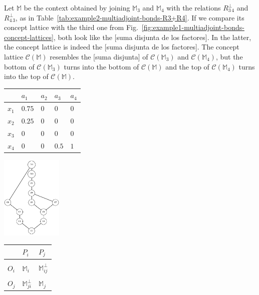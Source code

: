 \documentclass[runningheads,a4paper]{llncs}
\newcommand{\M}{\mathbb{M}}
\newcommand{\calC}{\mathcal C}
\newcommand{\editornote}[1]{{\color{red}[#1]}}
\begin{document}
\begin{example}
Let $\M$ be the context obtained by joining $\M_3$ and $\M_4$ with the relations $R_{3\,4}^\bot$ and $R_{4\,3}^\bot$, as in Table~\ref{tab:example2-multiadjoint-bonds-R3+R4}. If we compare its concept lattice with the third one from Fig.~\ref{fig:example1-multiadjoint-bonds-concept-lattices}, both look like the \editornote{suma disjunta de los factores}. In the latter, the concept lattice is indeed the \editornote{suma disjunta de los factores}. The concept lattice $\calC(\M)$ resembles the \editornote{suma disjunta} of $\calC(\M_3)$ and $\calC(\M_4)$, but the bottom of $\calC(\M_3)$ turns into the bottom of $\calC(\M)$ and the top of $\calC(\M_4)$ turns into the top of $\calC(\M)$.
\begin{table}
	\centering
	\vspace{-0.5cm}
	\begin{minipage}{0.3\textwidth}
	\begin{tabular}{w{c}{20pt} || w{c}{20pt} | w{c}{20pt} || w{c}{20pt} | w{c}{20pt}}
		& $a_1$ & $a_2$ & $a_3$ & $a_4$ \\\hline\hline
		$x_1$ & $0.75$ & $0$ & $0$ & $0$ \\\hline
		$x_2$ & $0.25$ & $0$ & $0$ & $0$ \\\hline\hline
		$x_3$ & $0$ & $0$ &$0$ & $0$ \\\hline
		$x_4$ & $0$ & $0$ &$0.5$ & $1$
	\end{tabular}
	\end{minipage}
	\hspace{1cm}
	\begin{minipage}{0.3\textwidth}
	\includegraphics[height = 4cm]{im/ex-ma2-R3+R4.png}
	\end{minipage}
	\begin{minipage}{0.25\textwidth}
	\begin{tabular}{w{c}{25pt} || w{c}{25pt} | w{c}{25pt}}
		& $P_i$ & $P_j$ \\[3pt]\hline\hline&&\\[-7pt]
		$O_i$ & $\M_i$ & $\M_{ij}^\bot$ \\[3pt]\hline&&\\[-7pt]
		$O_j$ & $\M_{ji}^\bot$ & $\M_j$ \\[3pt]

\end{tabular}
\end{minipage}
\end{table}
\end{example}
\end{document}
